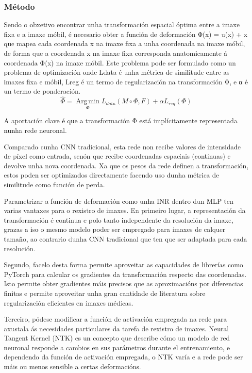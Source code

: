 \subsubsection{Método}
\label{subsubsec:Método}

Sendo o obxetivo encontrar unha transformación espacial óptima entre a imaxe fixa e a imaxe móbil,
é necesario obter a función de deformación  Φ(x) = u(x) + x que mapea cada coordenada x na imaxe fixa a unha coordenada na imaxe móbil, 
de forma que a coordenada x na imaxe fixa corresponda anatomicamente á coordenada Φ(x) na imaxe móbil.
Este problema pode ser formulado como un problema de optimización onde Ldata é unha métrica de similitude entre as imaxes fixa e móbil, Lreg é un termo de regularización na transformación Φ, e α é un termo de ponderación.
\begin{equation}
   \hat{\Phi} = \operatorname*{Arg\,min}_{\Phi} L_{data}(M \circ \Phi, F) + \alpha L_{reg}(\Phi)
\end{equation}

A aportación clave é que a transformación Φ está implícitamente representada nunha rede neuronal.

Comparado cunha CNN tradicional, esta rede non recibe valores de intensidade de píxel como entrada,
senón que recibe coordenadas espaciais (continuas) e devolve unha nova coordenada.
Xa que os pesos da rede definen a transformación, estos poden ser optimizados directamente 
facendo uso dunha métrica de similitude como función de perda.

Parametrizar a función de deformación como unha INR dentro dun MLP ten varias vantaxes para o rexistro de imaxes.
En primeiro lugar, a representación da transformación é continua e polo tanto independente da resolución da imaxe, 
grazas a iso o mesmo modelo poder ser empregado para imaxes de calquer tamaño, ao contrario dunha CNN tradicional 
que ten que ser adaptada para cada resolución.

Segundo, facelo desta forma permite aproveitar as capacidades de librerías como PyTorch para calcular os gradientes da transformación respecto das coordenadas.
Isto permite obter gradientes máis precisos que as aproximacións por diferencias finitas 
e permite aproveitar unha gran cantidade de literatura sobre regularización eficientes en imaxes médicas.

Terceiro, pódese modificar a función de activación empregada na rede para axustala ás necesidades particulares da tarefa de rexistro de imaxes.
Neural Tangent Kernel (NTK) es un concepto que describe cómo un modelo de red neuronal responde a cambios en sus parámetros durante el entrenamiento,
e dependendo da función de activación empregada, o NTK varía e a rede pode ser máis ou menos sensible a certas deformacións.


